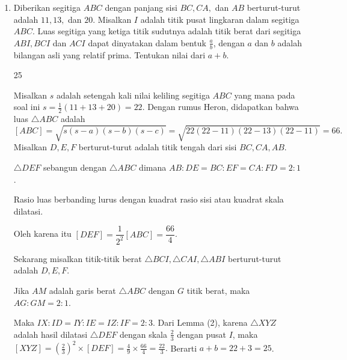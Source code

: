 \documentclass[12pt]{scrartcl}
\begin{document}
\begin{enumerate}[resume]
	
    \item Diberikan segitiga $ABC$ dengan panjang sisi $BC,CA,$ dan $AB$ berturut-turut adalah $11,13,$ dan $20$. Misalkan $I$ adalah titik pusat lingkaran dalam segitiga $ABC$. Luas segitiga yang ketiga titik sudutnya adalah titik berat dari segitiga $ABI,BCI$ dan $ACI$ dapat dinyatakan dalam bentuk $\frac{a}{b}$, dengan $a$ dan $b$ adalah bilangan asli yang relatif prima. Tentukan nilai dari $a+b$.

    \begin{jawaban}
	25
    \end{jawaban}
    \begin{solusi}
	Misalkan $s$ adalah setengah kali nilai keliling segitiga $ABC$ yang mana pada soal ini $s = \frac12(11+13+20) = 22$. Dengan rumus Heron, didapatkan bahwa luas $\triangle ABC$ adalah $$[ABC]=\sqrt{s(s-a)(s-b)(s-c)}=\sqrt{22(22-11)(22-13)(22-11)}=66.$$
	Misalkan $D,E,F$ berturut-turut adalah titik tengah dari sisi $BC,CA,AB$. 
    \begin{lemmarev}[1]
        $\triangle DEF$ sebangun dengan $\triangle ABC$ dimana $AB:DE=BC:EF=CA:FD=2:1$.
    \end{lemmarev}
		
    \begin{lemmarev}[2]
        Rasio luas berbanding lurus dengan kuadrat rasio sisi atau kuadrat skala dilatasi.
    \end{lemmarev}
    Oleh karena itu  $[DEF]=\dfrac{1}{2^2}[ABC]=\dfrac{66}{4}$.
		
	Sekarang misalkan titik-titik berat $\triangle BCI, \triangle CAI, \triangle ABI$ berturut-turut adalah $D,E,F$. 
		
    \begin{lemmarev}[3]
        Jika $AM$ adalah garis berat $\triangle ABC$ dengan $G$ titik berat, maka $AG:GM = 2:1$.
    \end{lemmarev}
		
	Maka $IX:ID=IY:IE=IZ:IF=2:3$. Dari Lemma (2), karena $\triangle XYZ$ adalah hasil dilatasi $\triangle DEF$ dengan skala $\frac{2}{3}$ dengan pusat $I$, maka $[XYZ]=\left (\frac{2}{3}\right)^2\times [DEF]=\frac{4}{9}\times\frac{66}{4}=\frac{22}{3}.$ Berarti $a+b=22+3=25$.
		
    \end{solusi}
    

\end{enumerate}
\end{document}
